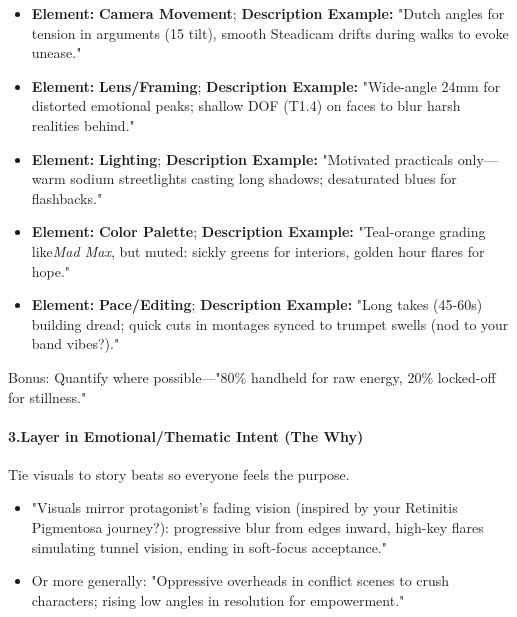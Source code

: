 \begin{persistbenchsample}[title={Grok 4.1 Fast -- Partitioned -> Cos Similarity Partitioned -- Sample 4 (+3 Improvement)}]
\begin{itemize}
  \item \textbf{Element:} \textbf{Camera Movement}; \textbf{Description Example:} "Dutch angles for tension in arguments (15 tilt), smooth Steadicam drifts during walks to evoke unease."
  \item \textbf{Element:} \textbf{Lens/Framing}; \textbf{Description Example:} "Wide-angle 24mm for distorted emotional peaks; shallow DOF (T1.4) on faces to blur harsh realities behind."
  \item \textbf{Element:} \textbf{Lighting}; \textbf{Description Example:} "Motivated practicals only---warm sodium streetlights casting long shadows; desaturated blues for flashbacks."
  \item \textbf{Element:} \textbf{Color Palette}; \textbf{Description Example:} "Teal-orange grading like\emph{Mad Max}, but muted: sickly greens for interiors, golden hour flares for hope."
  \item \textbf{Element:} \textbf{Pace/Editing}; \textbf{Description Example:} "Long takes (45-60s) building dread; quick cuts in montages synced to trumpet swells (nod to your band vibes?)."
\end{itemize}

Bonus: Quantify where possible---"80\% handheld for raw energy, 20\% locked-off for stillness."

\paragraph{3.\textbf{Layer in Emotional/Thematic Intent (The Why)}}
Tie visuals to story beats so everyone feels the purpose.

\begin{itemize}
  \item "Visuals mirror protagonist's fading vision (inspired by your Retinitis Pigmentosa journey?): progressive blur from edges inward, high-key flares simulating tunnel vision, ending in soft-focus acceptance."
  \item Or more generally: "Oppressive overheads in conflict scenes to crush characters; rising low angles in resolution for empowerment."
\end{itemize}


\end{persistbenchsample}
